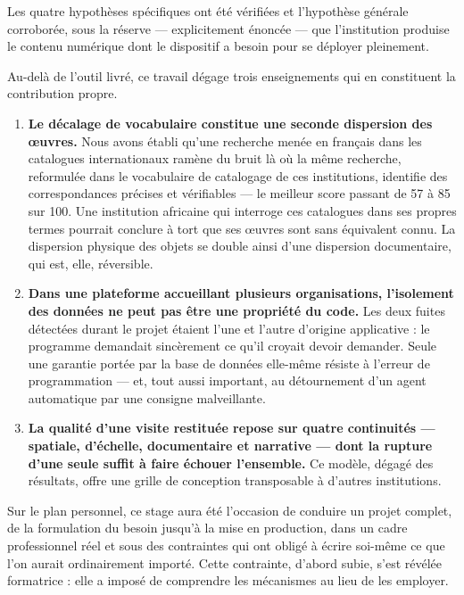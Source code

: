 Les quatre hypothèses spécifiques ont été vérifiées et l'hypothèse générale
corroborée, sous la réserve — explicitement énoncée — que l'institution produise
le contenu numérique dont le dispositif a besoin pour se déployer pleinement.

Au-delà de l'outil livré, ce travail dégage trois enseignements qui en
constituent la contribution propre.

\begin{enumerate}
  \item \textbf{Le décalage de vocabulaire constitue une seconde dispersion des
        œuvres.} Nous avons établi qu'une recherche menée en français dans les
        catalogues internationaux ramène du bruit là où la même recherche,
        reformulée dans le vocabulaire de catalogage de ces institutions,
        identifie des correspondances précises et vérifiables — le meilleur
        score passant de 57 à 85 sur 100. Une institution africaine qui
        interroge ces catalogues dans ses propres termes pourrait conclure à
        tort que ses œuvres sont sans équivalent connu. La dispersion physique
        des objets se double ainsi d'une dispersion documentaire, qui est,
        elle, réversible.

  \item \textbf{Dans une plateforme accueillant plusieurs organisations,
        l'isolement des données ne peut pas être une propriété du code.} Les
        deux fuites détectées durant le projet étaient l'une et l'autre
        d'origine applicative : le programme demandait sincèrement ce qu'il
        croyait devoir demander. Seule une garantie portée par la base de
        données elle-même résiste à l'erreur de programmation — et, tout aussi
        important, au détournement d'un agent automatique par une consigne
        malveillante.

  \item \textbf{La qualité d'une visite restituée repose sur quatre continuités
        — spatiale, d'échelle, documentaire et narrative — dont la rupture d'une
        seule suffit à faire échouer l'ensemble.} Ce modèle, dégagé des
        résultats, offre une grille de conception transposable à d'autres
        institutions.
\end{enumerate}

Sur le plan personnel, ce stage aura été l'occasion de conduire un projet
complet, de la formulation du besoin jusqu'à la mise en production, dans un
cadre professionnel réel et sous des contraintes qui ont obligé à écrire
soi-même ce que l'on aurait ordinairement importé. Cette contrainte, d'abord
subie, s'est révélée formatrice : elle a imposé de comprendre les mécanismes au
lieu de les employer.

